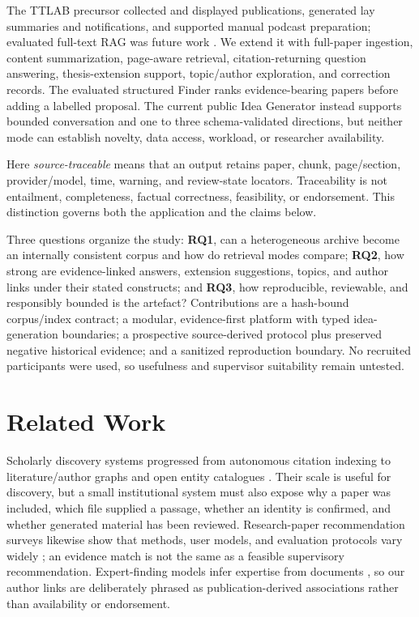 \documentclass[conference,letterpaper]{IEEEtran}
\begin{document}
The TTLAB precursor collected and displayed publications, generated lay summaries and notifications, and supported manual podcast preparation; evaluated full-text RAG was future work \cite{narine2025automating}. We extend it with full-paper ingestion, content summarization, page-aware retrieval, citation-returning question answering, thesis-extension support, topic/author exploration, and correction records. The evaluated structured Finder ranks evidence-bearing papers before adding a labelled proposal. The current public Idea Generator instead supports bounded conversation and one to three schema-validated directions, but neither mode can establish novelty, data access, workload, or researcher availability.

Here \emph{source-traceable} means that an output retains paper, chunk, page/section, provider/model, time, warning, and review-state locators. Traceability is not entailment, completeness, factual correctness, feasibility, or endorsement. This distinction governs both the application and the claims below.

Three questions organize the study: \textbf{RQ1}, can a heterogeneous archive become an internally consistent corpus and how do retrieval modes compare; \textbf{RQ2}, how strong are evidence-linked answers, extension suggestions, topics, and author links under their stated constructs; and \textbf{RQ3}, how reproducible, reviewable, and responsibly bounded is the artefact? Contributions are a hash-bound corpus/index contract; a modular, evidence-first platform with typed idea-generation boundaries; a prospective source-derived protocol plus preserved negative historical evidence; and a sanitized reproduction boundary. No recruited participants were used, so usefulness and supervisor suitability remain untested.

\section{Related Work}
Scholarly discovery systems progressed from autonomous citation indexing to literature/author graphs and open entity catalogues \cite{giles1998citeseer,tang2008arnetminer,priem2022openalex}. Their scale is useful for discovery, but a small institutional system must also expose why a paper was included, which file supplied a passage, whether an identity is confirmed, and whether generated material has been reviewed. Research-paper recommendation surveys likewise show that methods, user models, and evaluation protocols vary widely \cite{beel2016researchpaper}; an evidence match is not the same as a feasible supervisory recommendation. Expert-finding models infer expertise from documents \cite{balog2006formal}, so our author links are deliberately phrased as publication-derived associations rather than availability or endorsement.
\end{document}
